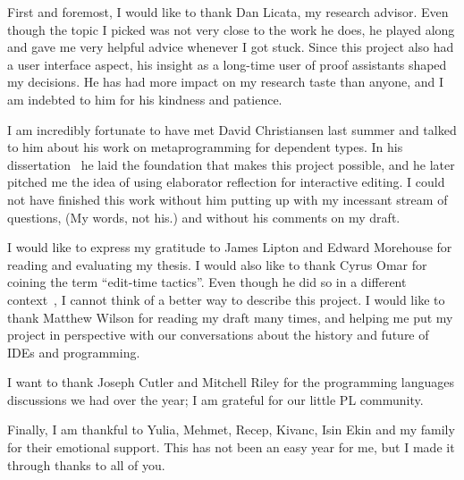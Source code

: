 \documentclass[11pt, ma]{westhesis}
\newcommand{\forceindent}{\hspace{\parindent}}
\theoremstyle{plain}
\theoremstyle{definition}
\numberwithin{section}{chapter}
\numberwithin{figure}{chapter}
\begin{document}
\begin{acknowledgements}
\forceindent First and foremost, I would like to thank Dan Licata, my research
  advisor.  Even though the topic I picked was not very close to the work he
  does, he played along and gave me very helpful advice whenever I got stuck.
  Since this project also had a user interface aspect, his insight as a
  long-time user of proof assistants shaped my decisions.  He has had more
  impact on my research taste than anyone, and I am indebted to him for his
  kindness and patience.

I am incredibly fortunate to have met David Christiansen last summer and talked
to him about his work on metaprogramming for dependent types.
In his dissertation~\cite{davidphd} he laid the foundation that makes this
project possible, and he later pitched me the idea of using elaborator
reflection for interactive editing.
I could not have finished this work without him putting up with my incessant
stream of questions, (My words, not his.) and without his comments on my draft.

I would like to express my gratitude to James Lipton and Edward Morehouse for
reading and evaluating my thesis. I would also like to thank Cyrus Omar for
coining the term ``edit-time tactics''. Even though he did so in a different
context~\cite{hazelnut,hazelEditor}, I cannot think of a better way to describe this
project. I would like to thank Matthew Wilson for reading my draft many
times, and helping me put my project in perspective with our conversations
about the history and future of IDEs and programming.

I want to thank Joseph Cutler and Mitchell Riley for the programming languages
discussions we had over the year; I am grateful for our little PL community.

Finally, I am thankful to Yulia, Mehmet, Recep, Kivanc, Isin Ekin and
my family for their emotional support. This has not been an easy year for me,
but I made it through thanks to all of you.
\end{acknowledgements}

\frontmatter
\maketitle
\makeabstract
\makededication
\makeack

\tableofcontents

\newcommand{\nocontentsline}[3]{}
\bgroup\let\addcontentsline=\nocontentsline
\renewcommand\numberline[1]{#1.\ }
\listoffigures
\egroup

\mainmatter












\end{document}
